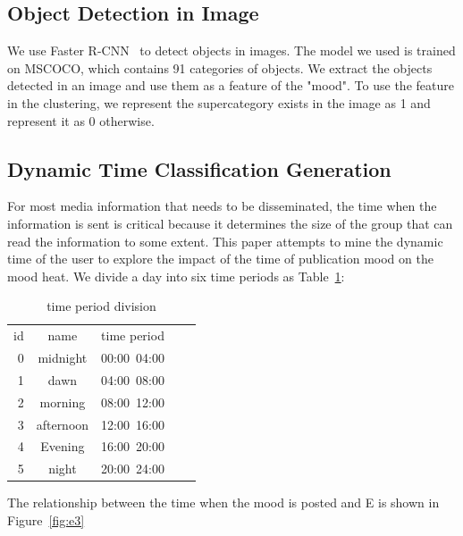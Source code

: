 \documentclass[10pt,twocolumn,letterpaper]{article}
\begin{document}
\subsection{Object Detection in Image}
    We use Faster R-CNN~\cite{Shaoqing17} to detect objects in images.
    The model we used is trained on MSCOCO, which contains 91 categories of objects.
    We extract the objects detected in an image and use them as a feature of the "mood".
    To use the feature in the clustering, we represent the supercategory exists in the image as 1 and represent it as 0 otherwise.

\subsection{Dynamic Time Classification Generation}
    For most media information that needs to be disseminated, the time when the information is sent is critical because it determines the size of the group that can read the information to some extent.
    This paper attempts to mine the dynamic time of the user to explore the impact of the time of publication mood on the mood heat.
    We divide a day into six time periods as Table~\ref{day}:
    \setlength{\tabcolsep}{20pt}
    \begin{table}
    \newcommand{\tabincell}[2]{\begin{tabular}{@{}#1@{}}#2\end{tabular}}
    \begin{center}
    \caption{time period division}
    \vspace{0.5cm}
    \label{day}
    \begin{tabular}{rcccc}
    \hline\noalign{\smallskip}
    id & name & time period \\
    \noalign{\smallskip}
    \hline
    \noalign{\smallskip}
    0 & midnight & 00:00~04:00\\
    1 & dawn & 04:00~08:00\\
    2 & morning & 08:00~12:00\\
    3 & afternoon & 12:00~16:00\\
    4 & Evening & 16:00~20:00\\
    5 & night & 20:00~24:00\\
    \hline
    \end{tabular}
    \end{center}
    \end{table}
    \setlength{\tabcolsep}{1.4pt}
    The relationship between the time when the mood is posted and E is shown in Figure~\ref{fig:e3}
\end{document}

